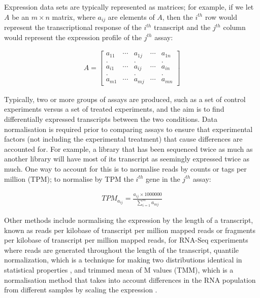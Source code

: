 Expression data sets are typically represented as matrices; for example, if we let $A$ be an $m \times n$ matrix, where $a_{ij}$ are elements of $A$, then the $i^{th}$ row would represent the transcriptional response of the $i^{th}$ transcript and the $j^{th}$ column would represent the expression profile of the $j^{th}$ assay:

\begin{align*}
   A = \begin{bmatrix} a_{11} & \cdots & a_{1j} & \cdots & a_{1n} \\
   . && . && . \\
   a_{i1} & \cdots & a_{ij} & \cdots & a_{in} \\
   . && . && . \\
   a_{m1} & \cdots & a_{mj} & \cdots & a_{mn} \end{bmatrix}
\end{align*}

Typically, two or more groups of assays are produced, such as a set of control experiments versus a set of treated experiments, and the aim is to find differentially expressed transcripts between the two conditions. Data normalisation is required prior to comparing assays to ensure that experimental factors (not including the experimental treatment) that cause differences are accounted for. For example, a library that has been sequenced twice as much as another library will have most of its transcript as seemingly expressed twice as much. One way to account for this is to normalise reads by counts or tags per million (TPM); to normalise by TPM the $i^{th}$ gene in the $j^{th}$ assay:

\begin{align*}
   TPM_{a_{ij}} = \frac{a_{ij} \times 1000000}{\sum_{i=1}^{m}{a_{mj}}}
\end{align*}

Other methods include normalising the expression by the length of a transcript, known as reads per kilobase of transcript per million mapped reads or fragments per kilobase of transcript per million mapped reads, for RNA-Seq experiments where reads are generated throughout the length of the transcript, quantile normalization, which is a technique for making two distributions identical in statistical properties \citep{pmid12538238}, and trimmed mean of M values (TMM), which is a normalisation method that takes into account differences in the RNA population from different samples by scaling the expression \citep{pmid20196867}.

